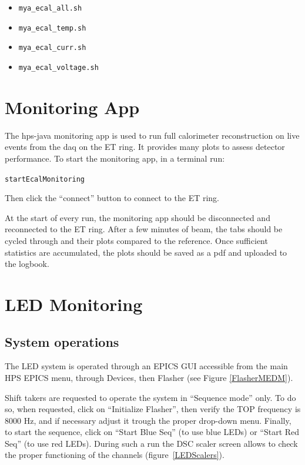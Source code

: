 \documentclass[12pt]{article}
\begin{document}
      \begin{itemize}
          \item \texttt{mya\_ecal\_all.sh}
          \item \texttt{mya\_ecal\_temp.sh}
          \item \texttt{mya\_ecal\_curr.sh}
          \item \texttt{mya\_ecal\_voltage.sh}
      \end{itemize}

\section{Monitoring App}
The hps-java monitoring app is used to run full calorimeter reconstruction on live events from the daq on the ET ring.  It provides many plots to assess detector performance.  To start the monitoring app, in a terminal run:
\begin{center}\texttt{startEcalMonitoring}\end{center}
Then click the ``connect'' button to connect to the ET ring.

At the start of every run, the monitoring app should be disconnected and reconnected to the ET ring.  After a few minutes of beam, the tabs should be cycled through and their plots compared to the reference.  Once sufficient statistics are accumulated, the plots should be saved as a pdf and uploaded to the logbook.

\newpage

   \section{LED Monitoring}
      \subsection{System operations}
      The LED system is operated through an EPICS GUI accessible from the main HPS EPICS menu, through Devices, then Flasher (see Figure \ref{FlasherMEDM}).

Shift takers are requested to operate the system in ``Sequence mode'' only. To do so, when requested, click on ``Initialize Flasher'', then verify the TOP frequency is 8000 Hz, and if necessary adjust it trough the proper drop-down menu. Finally, to start the sequence, click on ``Start Blue Seq'' (to use blue LEDs) or ``Start Red Seq'' (to use red LEDs). During such a run the DSC scaler screen allows to check the proper functioning of the channels (figure~\ref{LEDScalers}). 
\end{document}
